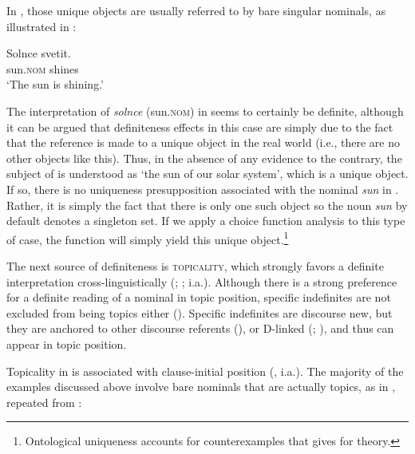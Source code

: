 \documentclass[output=paper]{langscibook}
\begin{document}
In , those unique objects are usually referred to by bare singular nominals, as illustrated in :

\ea \label{ex:seres:31}
\gll	Solnce		svetit.\\
		sun.\textsc{nom}		shines\\
\glt `The sun is shining.'
\z


\noindent The interpretation of \textit{solnce} (sun.\textsc{nom}) in  seems to certainly be definite, although it can be argued that definiteness effects in this case are simply due to the fact that the reference is made to a unique object in the real world (i.e., there are no other objects like this). Thus, in the absence of any evidence to the contrary, the subject of  is understood as `the sun of our solar system', which is a unique object. If so, there is no uniqueness presupposition associated with the nominal \textit{sun} in . Rather, it is simply the fact that there is only one such object so the noun \textit{sun} by default denotes a singleton set. If we apply a choice function analysis to this type of case, the function will simply yield this unique object.\footnote{Ontological uniqueness accounts for counterexamples that \citet{Dayal2017} gives for  theory.}

The next source of definiteness is \textsc{topicality}, which strongly favors a definite interpretation cross-linguistically (\citealt{Reinhart1981}; \citealt{Erteschik-Shir2007}; i.a.). Although there is a strong preference for a definite reading of a nominal in topic position, specific indefinites are not excluded from being topics either (\citealt{Reinhart1981}). Specific indefinites are discourse new, but they are anchored to other discourse referents (\citealt{Heusinger2002}), or D-linked (\citealt{Pesetsky1987}; \citealt{Dyakonova2009}), and thus can appear in topic position.


Topicality in  is associated with clause-initial position (\citealt{Geist2010, Jasinskaja2016}, i.a.). The majority of the examples discussed above involve bare nominals that are actually topics, as in , repeated from :
\end{document}
